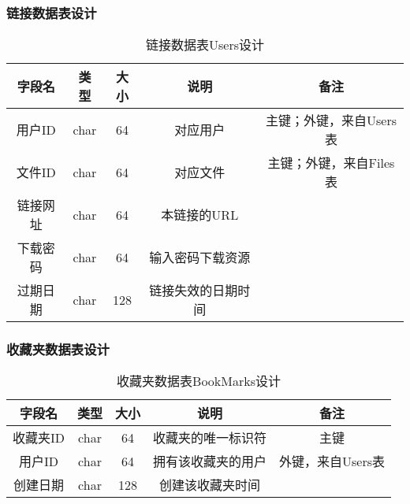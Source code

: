 \subsubsection{链接数据表设计}
\begin{table}[htbp]
\centering
\caption{链接数据表Users设计} \label{tab:link-database}
\begin{tabular}{|c|c|c|c|c|}
    \hline
    字段名 & 类型 & 大小 & 说明 & 备注 \\
    \hline
    用户ID & char & 64 & 对应用户 & 主键；外键，来自Users表\\
    \hline
    文件ID & char & 64 & 对应文件 & 主键；外键，来自Files表\\
    \hline
    链接网址 & char & 64 & 本链接的URL & \\
    \hline
    下载密码 & char & 64 & 输入密码下载资源 & \\
    \hline
    过期日期 & char & 128 & 链接失效的日期时间 & \\
    \hline
\end{tabular}
\end{table}

\subsubsection{收藏夹数据表设计}
\begin{table}[htbp]
\centering
\caption{收藏夹数据表BookMarks设计} \label{tab:bookmarks-database}
\begin{tabular}{|c|c|c|c|c|}
    \hline
    字段名 & 类型 & 大小 & 说明 & 备注 \\
    \hline
    收藏夹ID & char & 64 & 收藏夹的唯一标识符 & 主键\\
    \hline
    用户ID & char & 64 & 拥有该收藏夹的用户 & 外键，来自Users表\\
    \hline
    创建日期 & char & 128 & 创建该收藏夹时间 & \\
    \hline
\end{tabular}
\end{table}


